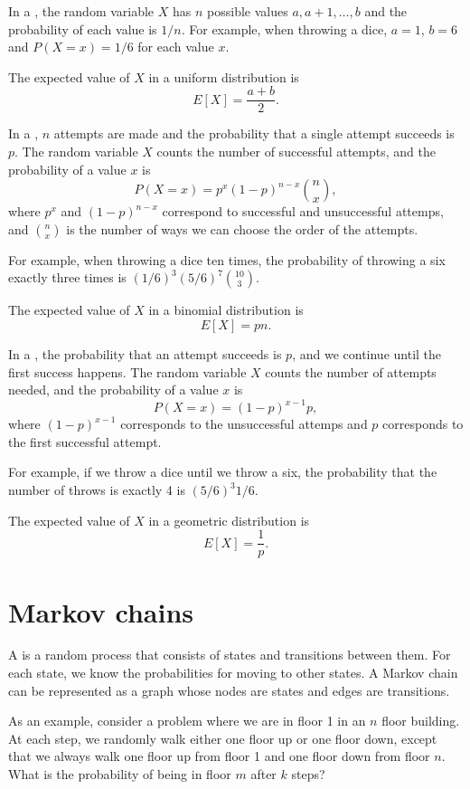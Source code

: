 In a ,
the random variable $X$ has $n$ possible
values $a,a+1,\ldots,b$ and the probability of each value is $1/n$.
For example, when throwing a dice,
$a=1$, $b=6$ and $P(X=x)=1/6$ for each value $x$.

The expected value of $X$ in a uniform distribution is
\[E[X] = \frac{a+b}{2}.\]

In a , $n$ attempts
are made
and the probability that a single attempt succeeds
is $p$.
The random variable $X$ counts the number of
successful attempts,
and the probability of a value $x$ is
\[P(X=x)=p^x (1-p)^{n-x} \binom{n}{x},\]
where $p^x$ and $(1-p)^{n-x}$ correspond to
successful and unsuccessful attemps,
and $\binom{n}{x}$ is the number of ways
we can choose the order of the attempts.

For example, when throwing a dice ten times,
the probability of throwing a six exactly
three times is $(1/6)^3 (5/6)^7 \binom{10}{3}$.

The expected value of $X$ in a binomial distribution is
\[E[X] = pn.\]

In a ,
the probability that an attempt succeeds is $p$,
and we continue until the first success happens.
The random variable $X$ counts the number
of attempts needed, and the probability of
a value $x$ is
\[P(X=x)=(1-p)^{x-1} p,\]
where $(1-p)^{x-1}$ corresponds to the unsuccessful attemps
and $p$ corresponds to the first successful attempt.

For example, if we throw a dice until we throw a six,
the probability that the number of throws
is exactly 4 is $(5/6)^3 1/6$.

The expected value of $X$ in a geometric distribution is
\[E[X]=\frac{1}{p}.\]

\section{Markov chains}


A 
is a random process
that consists of states and transitions between them.
For each state, we know the probabilities
for moving to other states.
A Markov chain can be represented as a graph
whose nodes are states and edges are transitions.

As an example, consider a problem
where we are in floor 1 in an $n$ floor building.
At each step, we randomly walk either one floor
up or one floor down, except that we always
walk one floor up from floor 1 and one floor down
from floor $n$.
What is the probability of being in floor $m$
after $k$ steps?

